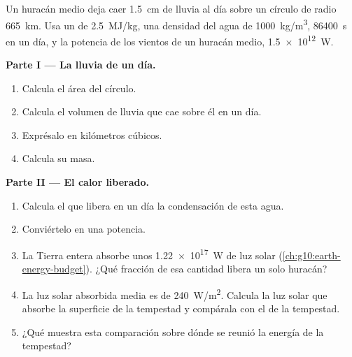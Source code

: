 \begin{problem}
\label{pb:g10:storms-and-cyclones:1}
Un huracán medio deja caer \qty{1.5}{cm} de lluvia al día sobre un círculo
de radio \qty{665}{km}. Usa un  de \qty{2.5}{MJ/kg}, una
densidad del agua de \qty{1000}{kg/m^3}, \qty{86400}{s} en un día, y la
potencia de los vientos de un huracán medio, \qty{1.5e12}{W}.

\medskip
\noindent\textbf{Parte I --- La lluvia de un día.}
\begin{enumerate}
  \item Calcula el área del círculo.
  \item Calcula el volumen de lluvia que cae sobre él en un día.
  \item Exprésalo en kilómetros cúbicos.
  \item Calcula su masa.
\end{enumerate}

\medskip
\noindent\textbf{Parte II --- El calor liberado.}
\begin{enumerate}[resume]
  \item Calcula el  que libera en un día la condensación de
        esta agua.
  \item Conviértelo en una potencia.
  \item La Tierra entera absorbe unos \qty{1.22e17}{W} de luz solar
        (\cref{ch:g10:earth-energy-budget}). ¿Qué fracción de esa cantidad
        libera un solo huracán?
  \item La luz solar absorbida media es de \qty{240}{W/m^2}. Calcula la luz
        solar que absorbe la superficie de la tempestad y compárala con el
         de la tempestad.
  \item ¿Qué muestra esta comparación sobre dónde se reunió la energía de
        la tempestad?
\end{enumerate}


\end{problem}
